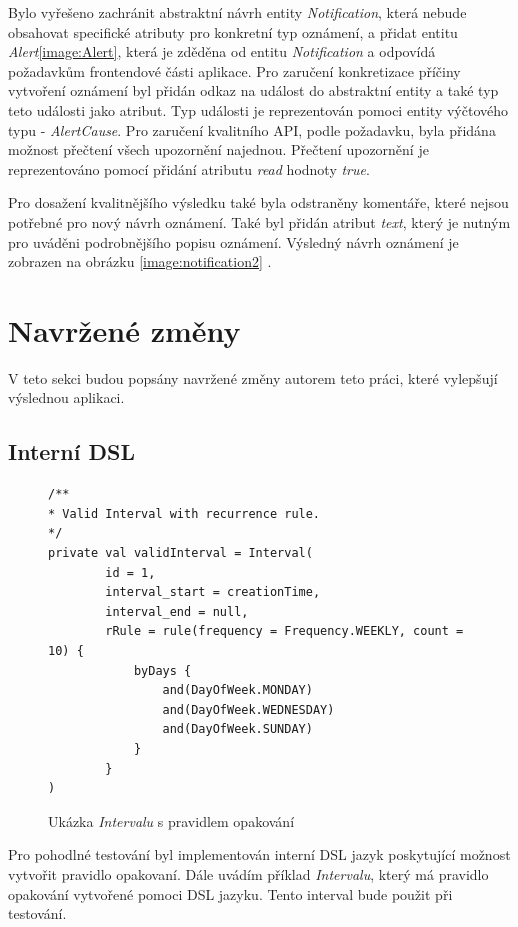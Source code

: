         Bylo vyřešeno zachránit abstraktní návrh entity \textit{Notification}, která nebude obsahovat specifické atributy pro konkretní typ oznámení, a přidat entitu \textit{Alert}\ref{image:Alert}, která je zděděna od entitu \textit{Notification} a odpovídá požadavkům frontendové části aplikace. Pro zaručení konkretizace příčiny vytvoření oznámení byl přidán odkaz na událost do abstraktní entity a také typ teto události jako atribut. Typ události je reprezentován pomoci entity výčtového typu - \textit{AlertCause}. Pro zaručení kvalitního API, podle požadavku, byla přidána možnost přečtení všech upozornění najednou. Přečtení upozornění je reprezentováno pomocí přidání atributu \textit{read} hodnoty \textit{true}.
        
        Pro dosažení kvalitnějšího výsledku také byla odstraněny komentáře, které nejsou potřebné pro nový návrh oznámení. Také byl přidán atribut \textit{text}, který je nutným pro uváděni podrobnějšího popisu oznámení. Výsledný návrh oznámení je zobrazen na obrázku \ref{image:notification2} .
            
\section{Navržené změny}
    V teto sekci budou popsány navržené změny autorem teto práci, které vylepšují výslednou aplikaci.
    
    \subsection{Interní DSL}\label{navrh:zmeny:dsl}
        \begin{figure} %
            \begin{verbatim}
/**
* Valid Interval with recurrence rule.
*/
private val validInterval = Interval(
        id = 1,
        interval_start = creationTime,
        interval_end = null,
        rRule = rule(frequency = Frequency.WEEKLY, count = 10) {
            byDays {
                and(DayOfWeek.MONDAY)
                and(DayOfWeek.WEDNESDAY)
                and(DayOfWeek.SUNDAY)
            }
        }
)
            \end{verbatim}
            \caption{Ukázka \textit{Intervalu} s pravidlem opakování} 
            \label{code:valid-interval}
        \end{figure}
        Pro pohodlné testování byl implementován interní DSL jazyk poskytující možnost vytvořit pravidlo opakovaní. Dále uvádím příklad \textit{Intervalu}, který má pravidlo opakování vytvořené pomoci DSL jazyku. Tento interval bude použit při testování.

